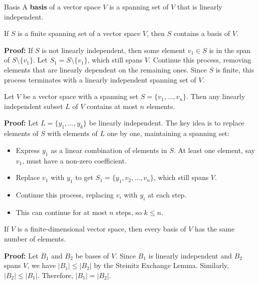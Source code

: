 \documentclass[a4paper, 9pt]{extarticle}
\begin{document}
\begin{definitionbox}{Basis}{}
  A \textbf{basis} of a vector space $V$ is a spanning set of $V$ that is linearly independent.
\end{definitionbox}

\begin{lemmabox}{}{}
  If $S$ is a finite spanning set of a vector space $V$, then $S$ contains a basis of $V$.
\end{lemmabox}

\noindent \textbf{Proof:} If $S$ is not linearly independent, then some element $v_1 \in S$ is in the span of $S \setminus \{v_1\}$. Let $S_1 = S \setminus \{v_1\}$, which still spans $V$. Continue this process, removing elements that are linearly dependent on the remaining ones. Since $S$ is finite, this process terminates with a linearly independent spanning set of $V$.

\begin{theorembox}{}
  Let $V$ be a vector space with a spanning set $S = \{v_1, \ldots, v_n\}$. Then any linearly independent subset $L$ of $V$ contains at most $n$ elements.
\end{theorembox}
\noindent \textbf{Proof:} Let $L = \{y_1, \ldots, y_k\}$ be linearly independent. The key idea is to replace elements of $S$ with elements of $L$ one by one, maintaining a spanning set:
\begin{itemize}
  \item Express $y_1$ as a linear combination of elements in $S$. At least one element, say $v_1$, must have a non-zero coefficient.
  \item Replace $v_1$ with $y_1$ to get $S_1 = \{y_1, v_2, \ldots, v_n\}$, which still spans $V$.
  \item Continue this process, replacing $v_i$ with $y_i$ at each step.
  \item This can continue for at most $n$ steps, so $k \leq n$.
\end{itemize}

\begin{theorembox}
  If $V$ is a finite-dimensional vector space, then every basis of $V$ has the same number of elements.
\end{theorembox}

\noindent \textbf{Proof:} Let $B_1$ and $B_2$ be bases of $V$. Since $B_1$ is linearly independent and $B_2$ spans $V$, we have $|B_1| \leq |B_2|$ by the Steinitz Exchange Lemma. Similarly, $|B_2| \leq |B_1|$. Therefore, $|B_1| = |B_2|$.
\end{document}
